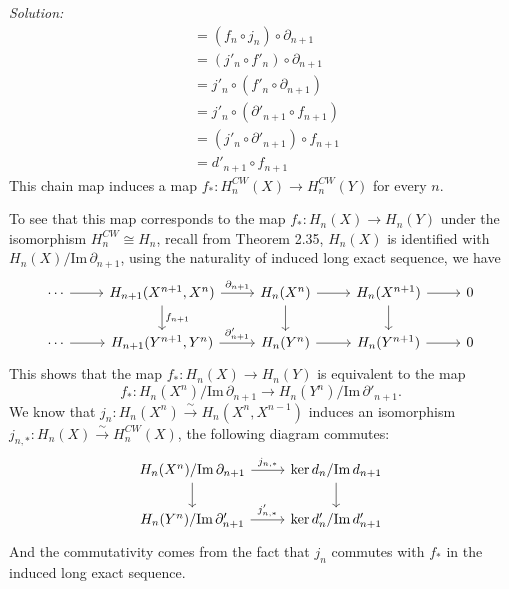\documentclass[a4paper, 12pt]{article}
\newenvironment{solution}
    {\textit{Solution:}}
    {}
\begin{document}
\begin{solution}
\begin{align*}
                    &=(f_n\circ j_n)\circ \partial_{n+1}\\
                    &=(j'_n\circ f'_n)\circ \partial_{n+1}\\ 
                    &=j'_n\circ (f'_n\circ \partial_{n+1})\\ 
                    &=j'_n\circ (\partial'_{n+1}\circ f_{n+1})\\ 
                    &=(j'_n\circ \partial'_{n+1})\circ f_{n+1}\\ 
                    &=d'_{n+1}\circ f_{n+1}
\end{align*}
This chain map induces a map \(f_*:H_n^{CW}(X)\rightarrow H_n^{CW}(Y)\) for every \(n\). 

To see that this map corresponds to the map \(f_*:H_n(X)\rightarrow H_n(Y)\) under the isomorphism \(H_n^{CW}\cong H_n\), recall from Theorem 2.35, \(H_n(X)\) is identified 
with \(H_n(X)/\text{Im}\, \partial_{n+1}\), using the naturality of induced long exact sequence, we have 
\[\begin{tikzcd}
	\cdots & {H_{n+1}(X^{n+1},X^n)} & {H_n(X^n)} & {H_n(X^{n+1})} & 0 \\
	\cdots & {H_{n+1}(Y^{n+1},Y^n)} & {H_n(Y^n)} & {H_n(Y^{n+1})} & 0
	\arrow[from=1-1, to=1-2]
	\arrow["{\partial_{n+1}}", from=1-2, to=1-3]
	\arrow["{f_{n+1}}", from=1-2, to=2-2]
	\arrow[from=1-3, to=1-4]
	\arrow[from=1-3, to=2-3]
	\arrow[from=1-4, to=1-5]
	\arrow[from=1-4, to=2-4]
	\arrow[from=2-1, to=2-2]
	\arrow["{\partial'_{n+1}}", from=2-2, to=2-3]
	\arrow[from=2-3, to=2-4]
	\arrow[from=2-4, to=2-5]
\end{tikzcd}\]
This shows that the map \(f_*:H_n(X)\rightarrow H_n(Y)\) is equivalent to the map 
\[f_*:H_n(X^n)/\text{Im}\, \partial_{n+1}\rightarrow H_n(Y^n)/\text{Im}\, \partial'_{n+1}.\]
We know that \(j_n:H_n(X^n)\xrightarrow{\sim} H_n(X^n,X^{n-1})\) induces an isomorphism \(j_{n,*}:H_n(X)\xrightarrow{\sim} H_n^{CW}(X)\), the following diagram commutes: 
\[\begin{tikzcd}
	{H_n(X^n)/\text{Im}\, \partial_{n+1}} & {\ker d_n/\text{Im}\, d_{n+1}} \\
	{H_n(Y^n)/\text{Im}\,\partial'_{n+1}} & {\ker d'_n/\text{Im}\, d'_{n+1}}
	\arrow["{j_{n,*}}", from=1-1, to=1-2]
	\arrow[from=1-1, to=2-1]
	\arrow[from=1-2, to=2-2]
	\arrow["{j'_{n,*}}", from=2-1, to=2-2]
\end{tikzcd}\]
And the commutativity comes from the fact that \(j_n\) commutes with \(f_*\) in the induced long exact sequence.
\end{solution}
\end{document}
